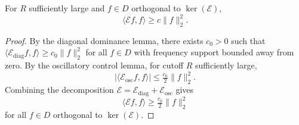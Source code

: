 \begin{theorem}
For $R$ sufficiently large and $f\in D$ orthogonal to $\ker(\mathcal E)$,
\[
\langle \mathcal E f,f\rangle \ge c\|f\|_2^2 .
\]
\end{theorem}

\begin{proof}
By the diagonal dominance lemma, there exists $c_0>0$ such that
$\langle \mathcal E_{\mathrm{diag}} f,f\rangle \ge c_0\|f\|_2^2$
for all $f\in D$ with frequency support bounded away from zero.
By the oscillatory control lemma, for cutoff $R$ sufficiently large,
\[
|\langle \mathcal E_{\mathrm{osc}} f,f\rangle| \le \tfrac{c_0}{2}\|f\|_2^2 .
\]
Combining the decomposition
$\mathcal E=\mathcal E_{\mathrm{diag}}+\mathcal E_{\mathrm{osc}}$
gives
\[
\langle \mathcal E f,f\rangle \ge \tfrac{c_0}{2}\|f\|_2^2
\]
for all $f\in D$ orthogonal to $\ker(\mathcal E)$.
\end{proof}

